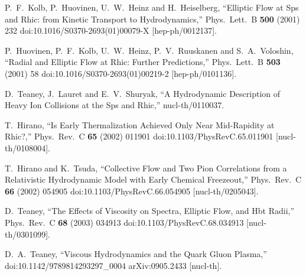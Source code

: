 \documentclass[a4paper,11pt]{article}
\begin{document}
\begin{thebibliography}{99}
  P.~F.~Kolb, P.~Huovinen, U.~W.~Heinz and H.~Heiselberg,
  ``Elliptic Flow at Sps and Rhic: from Kinetic Transport to Hydrodynamics,''
  Phys.\ Lett.\ B {\bf 500} (2001) 232
  doi:10.1016/S0370-2693(01)00079-X
  [hep-ph/0012137].


  P.~Huovinen, P.~F.~Kolb, U.~W.~Heinz, P.~V.~Ruuskanen and S.~A.~Voloshin,
  ``Radial and Elliptic Flow at Rhic: Further Predictions,''
  Phys.\ Lett.\ B {\bf 503} (2001) 58
  doi:10.1016/S0370-2693(01)00219-2
  [hep-ph/0101136].


  D.~Teaney, J.~Lauret and E.~V.~Shuryak,
  ``A Hydrodynamic Description of Heavy Ion Collisions at the Sps and Rhic,''
  nucl-th/0110037.


  T.~Hirano,
  ``Is Early Thermalization Achieved Only Near Mid-Rapidity at Rhic?,''
  Phys.\ Rev.\ C {\bf 65} (2002) 011901
  doi:10.1103/PhysRevC.65.011901
  [nucl-th/0108004].


  T.~Hirano and K.~Tsuda,
  ``Collective Flow and Two Pion Correlations from a Relativistic Hydrodynamic Model with Early Chemical Freezeout,''
  Phys.\ Rev.\ C {\bf 66} (2002) 054905
  doi:10.1103/PhysRevC.66.054905
  [nucl-th/0205043].


  D.~Teaney,
  ``The Effects of Viscosity on Spectra, Elliptic Flow, and Hbt Radii,''
  Phys.\ Rev.\ C {\bf 68} (2003) 034913
  doi:10.1103/PhysRevC.68.034913
  [nucl-th/0301099].



  D.~A.~Teaney,
  ``Viscous Hydrodynamics and the Quark Gluon Plasma,''
  doi:10.1142/9789814293297\_0004
  arXiv:0905.2433 [nucl-th].




\end{thebibliography}
\end{document}
